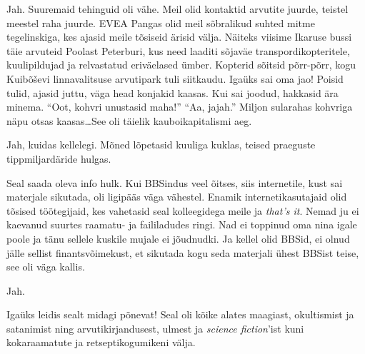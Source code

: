 
Jah. Suuremaid tehinguid oli vähe. Meil olid kontaktid arvutite juurde, 
teistel meestel raha juurde. 
EVEA Pangas olid meil sõbralikud suhted mitme tegelinskiga, kes 
ajasid meile tõsiseid ärisid välja. Näiteks viisime Ikaruse 
bussi täie arvuteid Poolast Peterburi, kus need laaditi
sõjaväe transpordikopteritele, kuulipildujad ja relvastatud eriväelased ümber. Kopterid sõitsid põrr-põrr, kogu 
Kuibõševi linnavalitsuse arvutipark tuli siitkaudu. Igaüks sai oma jao! 
Poisid tulid, ajasid juttu, väga head konjakid kaasas. Kui sai joodud, 
hakkasid ära minema. \enquote{Oot, kohvri unustasid maha!} \enquote{Aa, jajah.} Miljon 
sularahas kohvriga näpu otsas kaasas\ldots See oli täielik
kauboikapitalismi aeg. 


Jah, kuidas kellelegi. Mõned lõpetasid kuuliga kuklas, teised 
praeguste tippmiljardäride hulgas. 


Seal saada oleva info hulk. Kui BBSindus veel õitses, siis internetile, kust 
sai materjale sikutada, oli ligipääs väga vähestel. Enamik internetikasutajaid olid tõsised töötegijaid, kes vahetasid seal 
kolleegidega meile ja \emph{that's it}. Nemad ju ei kaevanud 
suurtes raamatu- ja faililadudes ringi. Nad ei 
toppinud oma nina igale poole ja tänu sellele kuskile mujale ei jõudnudki. Ja 
kellel olid BBSid, ei olnud jälle sellist finantsvõimekust, et sikutada kogu 
seda materjali ühest BBSist teise, see oli väga kallis.


Jah.


Igaüks leidis sealt midagi põnevat! Seal oli kõike alates maagiast, 
okultismist ja satanimist ning arvutikirjandusest, ulmest ja \emph{science 
fiction}'ist kuni kokaraamatute ja retseptikogumikeni välja.


